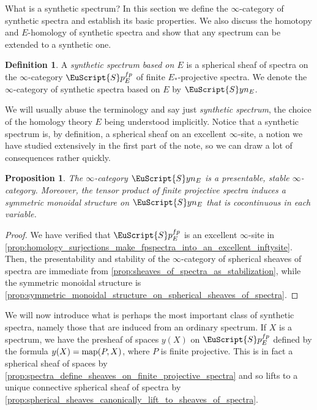 \documentclass[oneside,a4paper]{amsart}
\makeatletter
\newcommand{\euscr}[1]{\EuScript{#1}} %
\newcommand{\map}{\textnormal{map}} %
\newcommand{\spectra}{\euscr{S}p} %
\newcommand{\synspectra}{\euscr{S}yn} %
\theoremstyle{plain}
\newtheorem{prop}[thm]{Proposition}
\theoremstyle{definition}
\newtheorem{defin}[thm]{Definition}
\theoremstyle{remark}
\def\subsection{\@startsection{subsection}{1}%
  \z@{.7\linespacing\@plus\linespacing}{.5\linespacing}%
  {\normalfont\bfseries\centering}}%
\makeatother
\begin{document}
\subsection{What is a synthetic spectrum?}
In this section we define the $\infty$-category of synthetic spectra and establish its basic properties. We also discuss the homotopy and $E$-homology of synthetic spectra and show that any spectrum can be extended to a synthetic one. 

\begin{defin}
\label{defin:synthetic_spectrum_based_on_e}
A \emph{synthetic spectrum based on $E$} is a spherical sheaf of spectra on the $\infty$-category $\spectra_{E}^{fp}$ of finite $E_{*}$-projective spectra. We denote the $\infty$-category of synthetic spectra based on $E$ by $\synspectra _{E}$.
\end{defin}

We will usually abuse the terminology and say just \emph{synthetic spectrum}, the choice of the homology theory $E$ being understood implicitly. Notice that a synthetic spectrum is, by definition, a spherical sheaf on an excellent $\infty$-site, a notion we have studied extensively in the first part of the note, so we can draw a lot of consequences rather quickly. 

\begin{prop}
\label{prop:synthetic_spectra_is_a_stable_presentable_infty_category}
The $\infty$-category $\synspectra_{E}$ is a presentable, stable $\infty$-category. Moreover, the tensor product of finite projective spectra induces a symmetric monoidal structure on $\synspectra_{E}$ that is cocontinuous in each variable. 
\end{prop}

\begin{proof}
We have verified that $\spectra_{E}^{fp}$ is an excellent $\infty$-site in \cref{prop:homology_surjections_make_fpspectra_into_an_excellent_inftysite}. Then, the presentability and stability of the $\infty$-category of spherical sheaves of spectra are immediate from \cref{prop:sheaves_of_spectra_as_stabilization}, while the symmetric monoidal structure is \cref{prop:symmetric_monoidal_structure_on_spherical_sheaves_of_spectra}.
\end{proof}
We will now introduce what is perhaps the most important class of synthetic spectra, namely those that are induced from an ordinary spectrum. If $X$ is a spectrum, we have the presheaf of spaces $y(X)$ on $\spectra_{E}^{fp}$ defined by the formula $y(X) = \map(P, X)$, where $P$ is finite projective. This is in fact a spherical sheaf of spaces by \cref{prop:spectra_define_sheaves_on_finite_projective_spectra} and so lifts to a unique connective spherical sheaf of spectra by \cref{prop:spherical_sheaves_canonically_lift_to_sheaves_of_spectra}.
\end{document}
